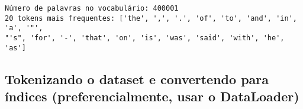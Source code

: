 \documentclass[10pt]{article}
\begin{document}
    \begin{Verbatim}[commandchars=\\\{\}]
Número de palavras no vocabulário: 400001
20 tokens mais frequentes: ['the', ',', '.', 'of', 'to', 'and', 'in', 'a', '"',
"'s", 'for', '-', 'that', 'on', 'is', 'was', 'said', 'with', 'he', 'as']
    \end{Verbatim}

    \hypertarget{tokenizando-o-dataset-e-convertendo-para-uxedndices-preferencialmente-usar-o-dataloader}{%
\subsection{Tokenizando o dataset e convertendo para índices
(preferencialmente, usar o
DataLoader)}\label{tokenizando-o-dataset-e-convertendo-para-uxedndices-preferencialmente-usar-o-dataloader}}
\end{document}
